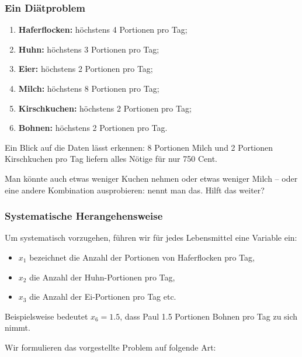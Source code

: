 \documentclass[smaller]{beamer}
\begin{document}
\begin{frame}
 \frametitle{Ein Diätproblem}
  \begin{enumerate}
  \item \textbf{Haferflocken:} höchstens 4 Portionen pro Tag;
  \item \textbf{Huhn:} höchstens 3 Portionen pro Tag;
  \item \textbf{Eier:} höchstens 2 Portionen pro Tag;
  \item \textbf{Milch:} höchstens 8 Portionen pro Tag;
  \item \textbf{Kirschkuchen:} höchstens 2 Portionen pro Tag;
  \item \textbf{Bohnen:} höchstens 2 Portionen pro Tag.
  \end{enumerate}
  \vspace*{0.2cm}
  Ein Blick auf die Daten lässt erkennen: 8 Portionen Milch und 2 Portionen Kirschkuchen pro Tag liefern alles Nötige für nur 750 Cent. 

  Man könnte auch etwas weniger Kuchen nehmen oder etwas weniger Milch – oder eine andere Kombination ausprobieren:  nennt man das. \alert{Hilft das weiter?}
\end{frame}

\begin{frame}
 \frametitle{Systematische Herangehensweise}
 Um systematisch vorzugehen, führen wir für jedes Lebensmittel eine Variable ein: 
 \begin{itemize}
  \item $x_1$ bezeichnet die Anzahl der Portionen von Haferflocken pro Tag, 
  \item $x_2$ die Anzahl der Huhn-Portionen pro Tag,
  \item $x_3$ die Anzahl der Ei-Portionen pro Tag etc. 
 \end{itemize}
 Beispielsweise bedeutet $x_6 = 1.5$, dass Paul 1.5 Portionen Bohnen pro Tag zu sich nimmt.

 Wir formulieren das vorgestellte Problem auf folgende Art:
\end{frame}
\end{document}

